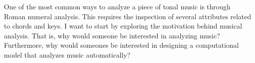 

One of the most common ways to analyze a piece of tonal
music is through Roman numeral analysis. This requires the
inspection of several attributes related to chords and keys.
I want to start by exploring the motivation behind musical
analysis. That is, why would someone be interested in
analyzing music? Furthermore, why would someones be
interested in designing a computational model that analyzes
music automatically?
